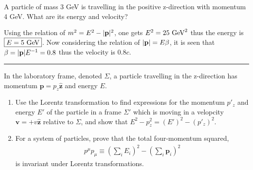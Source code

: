 \begin{problem}{2.4}
A particle of mass 3 GeV is travelling in the positive z-direction with momentum 4 GeV. What are its energy and velocity?
\end{problem}
\begin{solution}
Using the relation of $m^2=E^2- | \mathbf{p} |^2 $, one gets $E^2 = 25 \text{ GeV}^2$ thus the energy is $\boxed{E=5\text{ GeV}}$. Now considering the relation of $|\mathbf{p}|=E\beta$, it is seen that $\beta = |\mathbf{p}|E^{-1}=0.8$ thus the velocity is $\boxed{0.8c}$.\\ 
\end{solution} 
\noindent\rule{7in}{1.5pt}


\begin{problem}{2.5}
In the laboratory frame, denoted $\Sigma$, a particle travelling in the z-direction has momentum $\mathbf{p}=p_z \hat{\mathbf
z}$ and energy $E$.
\begin{enumerate}[label=(\alph*)]
    \item Use the Lorentz transformation to find expressions for the momentum $p'_z$ and energy $E'$ of the particle in a frame $\Sigma'$ which is moving in a velopcity $\mathbf{v}=+v\hat{\mathbf
    z}$ relative to $\Sigma$, and show that $E^2-p_z^2=(E')^2-(p'_z)^2$.
    \item For a system of particles, prove that the total four-momentum squared, 
    \begin{align*}
        p^\mu p_\mu \equiv  \left( \sum_{i}E_i \right)^2 - \left( \sum_{i}\mathbf{p}_i \right)^2
    \end{align*}
    is invariant under Lorentz transformations.
\end{enumerate}
\end{problem}


